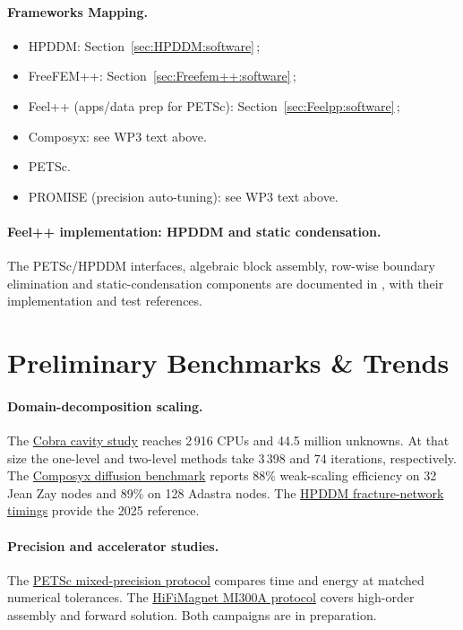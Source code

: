 \paragraph{Frameworks Mapping.}
\begin{itemize}
  \item HPDDM: Section~\ref{sec:HPDDM:software}\,; 
  \item FreeFEM++: Section~\ref{sec:Freefem++:software}\,; 
  \item Feel++ (apps/data prep for PETSc): Section~\ref{sec:Feelpp:software}\,; 
  \item Composyx: see WP3 text above.
  \item PETSc.
  \item PROMISE (precision auto-tuning): see WP3 text above.
\end{itemize}


\paragraph{Feel++ implementation: HPDDM and static condensation.}
The PETSc/HPDDM interfaces, algebraic block assembly, row-wise boundary elimination and static-condensation components are documented in , with their implementation and test references.

\section{Preliminary Benchmarks \& Trends}
\label{sec:wp3:benchmarks}

\paragraph{Domain-decomposition scaling.}
The \hyperref[tab:weak_scaling_cobra]{Cobra cavity study} reaches
2\,916 CPUs and 44.5 million unknowns. At that size the one-level and
two-level methods take 3\,398 and 74 iterations, respectively. The
\hyperref[sec:app:specs:app-composyx-diffusion]{Composyx diffusion
benchmark} reports 88\% weak-scaling efficiency on 32 Jean Zay nodes
and 89\% on 128 Adastra nodes. The
\hyperref[sec:app:specs:app-hpddm-dfn]{HPDDM fracture-network timings}
provide the 2025 reference.

\paragraph{Precision and accelerator studies.}
The \hyperref[sec:app:specs:app-petsc-mixed-precision]{PETSc mixed-precision
protocol} compares time and energy at matched numerical tolerances.
The \hyperref[sec:app:specs:app-feelpp-mi300a-fem]{HiFiMagnet MI300A
protocol} covers high-order assembly and forward solution. Both
campaigns are in preparation.

